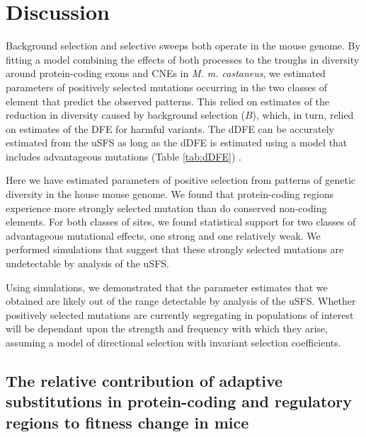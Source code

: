 \documentclass[11pt]{article}
\begin{document}
%
%

\section*{Discussion}

	Background selection and selective sweeps both operate in the mouse genome. By fitting a model combining the effects of both processes to the troughs in diversity around protein-coding exons and CNEs in \textit{M. m. castaneus}, we estimated parameters of positively selected mutations occurring in the two classes of element that predict the observed patterns. This relied on estimates of the reduction in diversity caused by background selection ($B$), which, in turn, relied on estimates of the DFE for harmful variants. The dDFE can be accurately estimated from the uSFS as long as the dDFE is estimated using a model that includes advantageous mutations (Table \ref{tab:dDFE}) \citep{RN354}. 

	Here we have estimated parameters of positive selection from patterns of genetic diversity in the house mouse genome. We found that protein-coding regions experience more strongly selected mutation than do conserved non-coding elements. For both classes of sites, we found statistical support for two classes of advantageous mutational effects, one strong and one relatively weak. We performed simulations that suggest that these strongly selected mutations are undetectable by analysis of the uSFS.
	
	Using simulations, we demonstrated that the parameter estimates that we obtained are likely out of the range detectable by analysis of the uSFS. Whether positively selected mutations are currently segregating in populations of interest will be dependant upon the strength and frequency with which they arise, assuming a model of directional selection with invariant selection coefficients.
	
\subsection*{The relative contribution of adaptive substitutions in protein-coding and regulatory regions to fitness change in mice}
\end{document}
